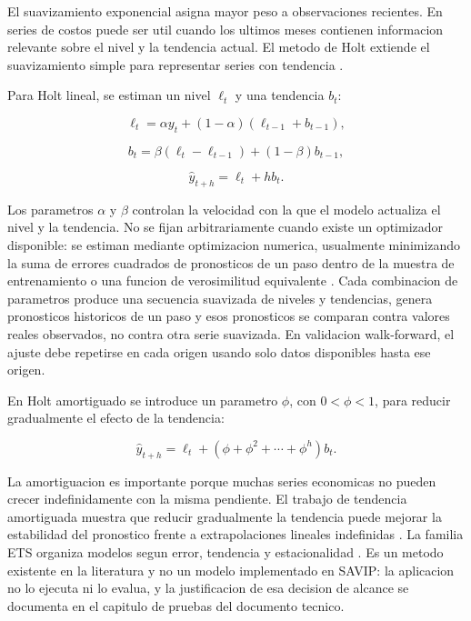 ﻿\documentclass[12pt,letterpaper]{article}
\newcommand{\yhat}{\hat{y}}
\begin{document}
El suavizamiento exponencial asigna mayor peso a observaciones recientes. En series de costos puede ser util cuando los ultimos meses contienen informacion relevante sobre el nivel y la tendencia actual. El metodo de Holt extiende el suavizamiento simple para representar series con tendencia \citep{holt1957,hyndman2021fpp3}.

Para Holt lineal, se estiman un nivel \(\ell_t\) y una tendencia \(b_t\):

\[
\ell_t=\alpha y_t+(1-\alpha)(\ell_{t-1}+b_{t-1}),
\]

\[
b_t=\beta(\ell_t-\ell_{t-1})+(1-\beta)b_{t-1},
\]

\[
\yhat_{t+h}=\ell_t+hb_t.
\]

Los parametros \(\alpha\) y \(\beta\) controlan la velocidad con la que el modelo actualiza el nivel y la tendencia. No se fijan arbitrariamente cuando existe un optimizador disponible: se estiman mediante optimizacion numerica, usualmente minimizando la suma de errores cuadrados de pronosticos de un paso dentro de la muestra de entrenamiento o una funcion de verosimilitud equivalente \citep{hyndman2021fpp3}. Cada combinacion de parametros produce una secuencia suavizada de niveles y tendencias, genera pronosticos historicos de un paso y esos pronosticos se comparan contra valores reales observados, no contra otra serie suavizada. En validacion walk-forward, el ajuste debe repetirse en cada origen usando solo datos disponibles hasta ese origen.

En Holt amortiguado se introduce un parametro \(\phi\), con \(0<\phi<1\), para reducir gradualmente el efecto de la tendencia:

\[
\yhat_{t+h}=\ell_t+(\phi+\phi^2+\cdots+\phi^h)b_t.
\]

La amortiguacion es importante porque muchas series economicas no pueden crecer indefinidamente con la misma pendiente. El trabajo de tendencia amortiguada muestra que reducir gradualmente la tendencia puede mejorar la estabilidad del pronostico frente a extrapolaciones lineales indefinidas \citep{hyndman2021fpp3}. La familia ETS organiza modelos segun error, tendencia y estacionalidad \citep{hyndman2021fpp3}. Es un metodo existente en la literatura y no un modelo implementado en SAVIP: la aplicacion no lo ejecuta ni lo evalua, y la justificacion de esa decision de alcance se documenta en el capitulo de pruebas del documento tecnico.




\end{document}
